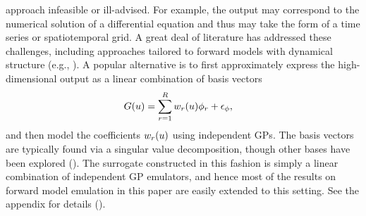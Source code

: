 \documentclass[12pt]{article}
\begin{document}
approach infeasible or ill-advised. For example, the output may correspond to the numerical solution of 
a differential equation and thus may take the form of a time series or spatiotemporal grid. 
A great deal of literature has addressed these challenges, including approaches tailored to forward models
with dynamical structure 
(e.g., \cite{GP_dynamic_emulation, Bayesian_emulation_dynamic, Liu_West_dynamic_emulation, dynamic_nonlinear_simulators_GP}).
A popular alternative is to first approximately express the high-dimensional output as a linear combination of basis vectors 
\begin{align}
G(u) &= \sum_{r=1}^{R} w_{r}(u) \phi_{r} + \epsilon_{\phi},
\end{align}
and then model the coefficients $w_{r}(u)$ using independent GPs. The basis vectors 
are typically found via a singular value decomposition, though other bases have been explored 
(\cite{HigdonBasis, emulate_functional_output, functionValuedModels, PODemulation}). The surrogate constructed in 
this fashion is simply a linear combination of independent GP emulators, and hence most of the results on forward model 
emulation in this paper are easily extended to this setting. See the appendix for details (\todo). 
\end{document}
